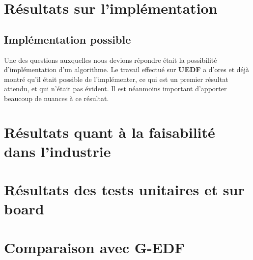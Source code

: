 
\section{Résultats sur l'implémentation}
	\subsection{Implémentation possible}
	
	Une des questions auxquelles nous devions répondre était la possibilité d'implémentation d'un algorithme.
	Le travail effectué sur \textbf{UEDF} a d'ores et déjà montré qu'il était possible de l'implémenter, ce qui est un premier résultat attendu, et qui n'était pas évident.
	Il est néanmoins important d'apporter beaucoup de nuances à ce résultat.\newline
	
	
	

\section{Résultats quant à la faisabilité dans l'industrie}

	

\section{Résultats des tests unitaires et sur board}

	

\section{Comparaison avec G-EDF}

	